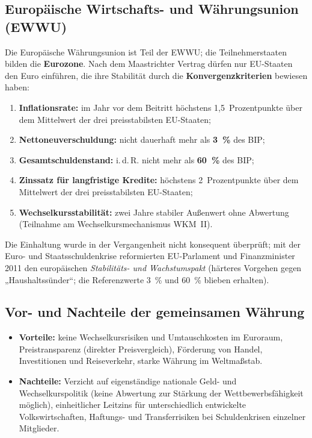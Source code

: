 \documentclass[11pt, a4paper]{article}
\begin{document}
\subsection{Europäische Wirtschafts- und Währungsunion (EWWU)}

Die Europäische Währungsunion ist Teil der EWWU; die Teilnehmerstaaten bilden die
\textbf{Eurozone}. Nach dem Maastrichter Vertrag dürfen nur EU-Staaten den Euro einführen,
die ihre Stabilität durch die \textbf{Konvergenzkriterien} bewiesen haben:

\begin{enumerate}
  \item \textbf{Inflationsrate:} im Jahr vor dem Beitritt höchstens 1,5~Prozentpunkte über
    dem Mittelwert der drei preisstabilsten EU-Staaten;
  \item \textbf{Nettoneuverschuldung:} nicht dauerhaft mehr als \textbf{3~\%} des BIP;
  \item \textbf{Gesamtschuldenstand:} i.\,d.\,R. nicht mehr als \textbf{60~\%} des BIP;
  \item \textbf{Zinssatz für langfristige Kredite:} höchstens 2~Prozentpunkte über dem
    Mittelwert der drei preisstabilsten EU-Staaten;
  \item \textbf{Wechselkursstabilität:} zwei Jahre stabiler Außenwert ohne Abwertung
    (Teilnahme am Wechselkursmechanismus WKM~II).
\end{enumerate}

Die Einhaltung wurde in der Vergangenheit nicht konsequent überprüft; mit der Euro- und
Staatsschuldenkrise reformierten EU-Parlament und Finanzminister 2011 den europäischen
\emph{Stabilitäts- und Wachstumspakt} (härteres Vorgehen gegen „Haushaltssünder``; die
Referenzwerte 3~\% und 60~\% blieben erhalten).

\subsection{Vor- und Nachteile der gemeinsamen Währung}

\begin{itemize}
  \item \textbf{Vorteile:} keine Wechselkursrisiken und Umtauschkosten im Euroraum,
    Preistransparenz (direkter Preisvergleich), Förderung von Handel, Investitionen und
    Reiseverkehr, starke Währung im Weltmaßstab.
  \item \textbf{Nachteile:} Verzicht auf eigenständige nationale Geld- und
    Wechselkurspolitik (keine Abwertung zur Stärkung der Wettbewerbsfähigkeit möglich),
    einheitlicher Leitzins für unterschiedlich entwickelte Volkswirtschaften,
    Haftungs- und Transferrisiken bei Schuldenkrisen einzelner Mitglieder.
\end{itemize}
\end{document}
